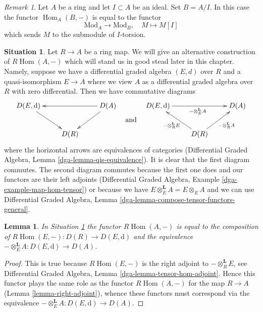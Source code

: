 \documentclass{stacks-project}
\theoremstyle{plain}
\newtheorem{lemma}[subsection]{Lemma}
\theoremstyle{definition}
\newtheorem{situation}[subsection]{Situation}
\theoremstyle{remark}
\newtheorem{remark}[subsection]{Remark}
\numberwithin{equation}{subsection}
\def\Hom{\mathop{\mathrm{Hom}}\nolimits}
\begin{document}
\begin{remark}
\label{remark-exact-support}
Let $A$ be a ring and let $I \subset A$ be an ideal. Set $B = A/I$.
In this case the functor $\Hom_A(B, -)$ is equal to the functor
$$
\text{Mod}_A \longrightarrow \text{Mod}_B,\quad M \longmapsto M[I]
$$
which sends $M$ to the submodule of $I$-torsion.
\end{remark}

\begin{situation}
\label{situation-resolution}
Let $R \to A$ be a ring map.
We will give an alternative construction of $R\Hom(A, -)$
which will stand us in good stead later in this chapter.
Namely, suppose we have a differential graded algebra $(E, d)$
over $R$ and a quasi-isomorphism $E \to A$ where we view $A$
as a differential graded algebra over $R$ with zero differential.
Then we have commutative diagrams
$$
\vcenter{
\xymatrix{
D(E, \text{d}) \ar[rd] & &  D(A) \ar[ll] \ar[ld] \\
& D(R)
}
}
\quad\text{and}\quad
\vcenter{
\xymatrix{
D(E, \text{d}) \ar[rr]_{- \otimes_E^\mathbf{L} A} & &  D(A) \\
& D(R) \ar[lu]^{- \otimes_R^\mathbf{L} E} \ar[ru]_{- \otimes_R^\mathbf{L} A}
}
}
$$
where the horizontal arrows are equivalences of categories
(Differential Graded Algebra, Lemma \ref{dga-lemma-qis-equivalence}).
It is clear that the first diagram commutes.
The second diagram commutes because the first one does
and our functors are their left adjoints
(Differential Graded Algebra, Example \ref{dga-example-map-hom-tensor})
or because we have $E \otimes^\mathbf{L}_E A = E \otimes_E A$
and we can use 
Differential Graded Algebra, Lemma
\ref{dga-lemma-compose-tensor-functors-general}.
\end{situation}

\begin{lemma}
\label{lemma-RHom-dga}
In Situation \ref{situation-resolution} the functor $R\Hom(A, -)$
is equal to the composition of
$R\Hom(E, -) : D(R) \to D(E, \text{d})$
and the equivalence $- \otimes^\mathbf{L}_E A : D(E, \text{d}) \to D(A)$.
\end{lemma}

\begin{proof}
This is true because $R\Hom(E, -)$ is the right adjoint
to $- \otimes^\mathbf{L}_R E$, see
Differential Graded Algebra, Lemma \ref{dga-lemma-tensor-hom-adjoint}.
Hence this functor plays the same role as the functor
$R\Hom(A, -)$ for the map $R \to A$ (Lemma \ref{lemma-right-adjoint}),
whence these functors must correspond via the equivalence
$- \otimes^\mathbf{L}_E A : D(E, \text{d}) \to D(A)$.
\end{proof}
\end{document}
